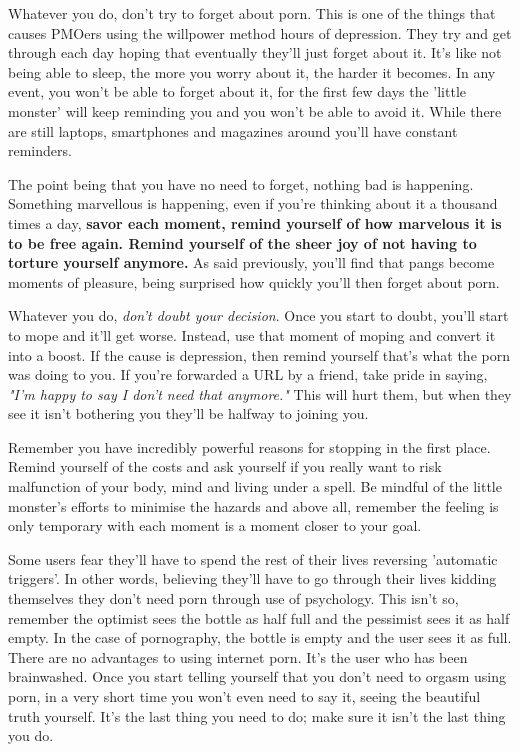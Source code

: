 \documentclass[easypeasy.tex]{subfiles}
\begin{document}
Whatever you do, don't try to forget about porn. This is one of the things that causes PMOers using the willpower method hours of depression. They try and get through each day hoping that eventually they'll just forget about it. It's like not being able to sleep, the more you worry about it, the harder it becomes. In any event, you won't be able to forget about it, for the first few days the 'little monster' will keep reminding you and you won't be able to avoid it. While there are still laptops, smartphones and magazines around you'll have constant reminders.

The point being that you have no need to forget, nothing bad is happening. Something marvellous is happening, even if you're thinking about it a thousand times a day, \textbf{savor each moment, remind yourself of how marvelous it is to be free again. Remind yourself of the sheer joy of not having to torture yourself anymore.} As said previously, you'll find that pangs become moments of pleasure, being surprised how quickly you'll then forget about porn.

Whatever you do, \textit{don't doubt your decision}. Once you start to doubt, you'll start to mope and it'll get worse. Instead, use that moment of moping and convert it into a boost. If the cause is depression, then remind yourself that's what the porn was doing to you. If you're forwarded a URL by a friend, take pride in saying, \textit{"I'm happy to say I don't need that anymore."} This will hurt them, but when they see it isn't bothering you they'll be halfway to joining you.

Remember you have incredibly powerful reasons for stopping in the first place. Remind yourself of the costs and ask yourself if you really want to risk malfunction of your body, mind and living under a spell. Be mindful of the little monster's efforts to minimise the hazards and above all, remember the feeling is only temporary with each moment is a moment closer to your goal.

Some users fear they'll have to spend the rest of their lives reversing 'automatic triggers'. In other words, believing they'll have to go through their lives kidding themselves they don't need porn through use of psychology. This isn't so, remember the optimist sees the bottle as half full and the pessimist sees it as half empty. In the case of pornography, the bottle is empty and the user sees it as full. There are no advantages to using internet porn. It's the user who has been brainwashed. Once you start telling yourself that you don't need to orgasm using porn, in a very short time you won't even need to say it, seeing the beautiful truth yourself. It's the last thing you need to do; make sure it isn't the last thing you do.
\end{document}
